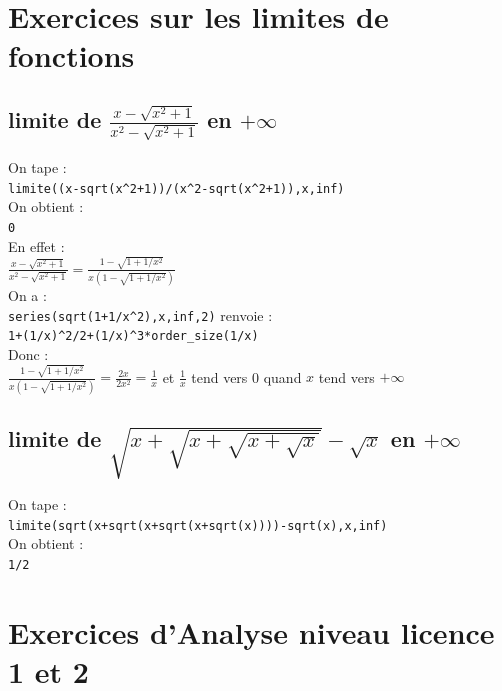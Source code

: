 \documentclass[a4paper,11pt]{book}
\begin{document}
\chapter{Exercices sur les limites de fonctions}
\section{limite de $\frac{x-\sqrt{x^2+1}}{x^2-\sqrt{x^2+1}}$ en $+\infty$}
On tape :\\
{\tt limite((x-sqrt(x\verb|^|2+1))/(x\verb|^|2-sqrt(x\verb|^|2+1)),x,inf)}\\
On obtient :\\
{\tt 0}\\
En effet :\\
$\frac{x-\sqrt{x^2+1}}{x^2-\sqrt{x^2+1}}=\frac{1-\sqrt{1+1/x^2}}{x(1-\sqrt{1+1/x^2})}$\\
On a :\\
{\tt series(sqrt(1+1/x\verb|^|2),x,inf,2)} renvoie :\\
{\tt 1+(1/x)\verb|^|2/2+(1/x)\verb|^|3*order\_size(1/x)}\\
Donc :\\
$\frac{1-\sqrt{1+1/x^2}}{x(1-\sqrt{1+1/x^2})}=\frac{2x}{2x^2}=\frac{1}{x}$
et $\frac{1}{x}$ tend vers 0 quand $x$ tend vers $+\infty$
\section{limite de $\sqrt{x+\sqrt{x+\sqrt{x+\sqrt{x}}}}-\sqrt{x}$ en $+\infty$}
On tape :\\
{\tt limite(sqrt(x+sqrt(x+sqrt(x+sqrt(x))))-sqrt(x),x,inf)}\\
On obtient :\\
{\tt 1/2}\\
\chapter{Exercices d'Analyse niveau licence 1 et 2}
\end{document}
